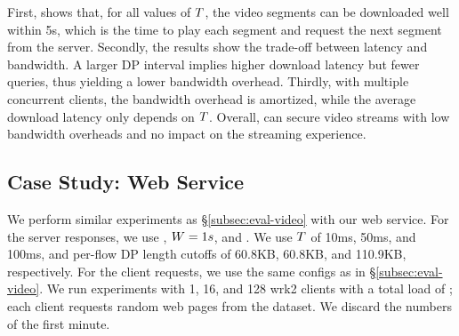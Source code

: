 First,  shows that, for all values of $T$,
the video segments can be downloaded well within 5s, which is the time to play
each segment and request the next segment from the server.
Secondly, the results show the trade-off between latency and bandwidth. A larger
DP interval implies higher download latency but fewer queries, thus
yielding a lower bandwidth overhead.
Thirdly, with multiple concurrent clients, the bandwidth overhead is
amortized, while the average download latency only depends on $T$.
Overall, {\sys} can secure video streams with low bandwidth overheads
and no impact on the streaming experience.


\subsection{Case Study: Web Service}\label{subsec:eval-web}
%
%
We perform similar experiments as \S\ref{subsec:eval-video} with our web
service. For the server responses, we use , $W =
1s$, and . We use $T$ of {10ms, 50ms, and
100ms}, and per-flow DP length cutoffs of 60.8KB, 60.8KB, and 110.9KB,
respectively.
For the client requests, we use the same configs as in
\S\ref{subsec:eval-video}. We run  experiments with 1, 16, and 128
wrk2 clients with a total load of ;
each client requests random web pages from the dataset. We discard the numbers
of the first minute.

